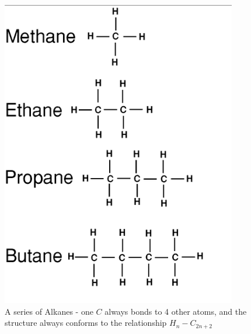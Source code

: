 \documentclass[a4paper,10pt]{report}
\begin{document}
\begin{figure}[h!]
	\begin{centering}
	\begin{center}
	\includegraphics[width=\linewidth]{./Pictures/alkanes.png}
	\caption{A series of Alkanes -  one $C$ always bonds to 4 other atoms, and the structure always conforms to the relationship $H_n-C_{2n+2}$}
	\label{fig:alkanes}
	\end{center}
	\par\end{centering}
\end{figure}
\end{document}
